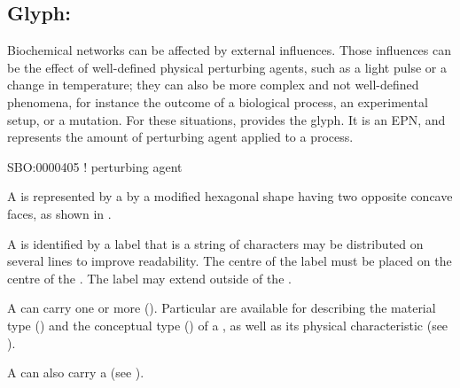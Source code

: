 
\subsection{Glyph: }
\label{sec:perturbing agent}

Biochemical networks can be affected by external influences.
Those influences can be the effect of well-defined physical perturbing agents, such as a light pulse or a change in temperature; they can also be more complex and not well-defined phenomena, for instance the outcome of a biological process, an experimental setup, or a mutation.
For these situations, \PD provides the  glyph. It is an EPN, and represents the amount of perturbing agent applied to a process.

\begin{glyphDescription}

\glyphSboTerm
SBO:0000405 ! perturbing agent



\glyphContainer
A  is represented by a by a modified hexagonal shape having two opposite concave faces, as shown in .

\glyphLabel
A  is identified by a label that is  a string of characters  may be distributed on several lines to improve readability.
The centre of the label must be placed on the centre of the .
The label may extend outside of the .

\glyphAux
A  can carry one or more  ().
Particular  are available for describing the material type () and the conceptual type () of a , as well as its physical characteristic (see ).

A  can also carry a  (see ).

\end{glyphDescription}

